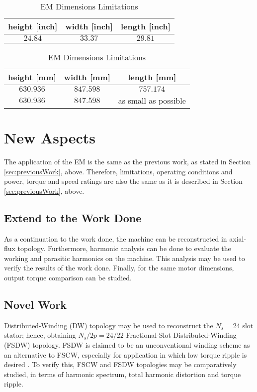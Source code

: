 \documentclass[11pt, a4paper]{article}
\begin{document}
	\begin{table}[h]
	\caption{Dimensions}
		\begin{subtable}[h]{1.00\textwidth}
			\begin{center}
				\begin{tabular}{c|c|c}
					height [inch] &  width [inch] &  length [inch]\\
					\hline
					$24.84$ & $33.37$ & $29.81$
				\end{tabular}
			\caption{Lycoming IO-360-L2A Dimensions}
			\end{center}
		\end{subtable}
		\begin{subtable}[h]{1.00\textwidth}
			\begin{center}
				\begin{tabular}{c|c|c}
					height [mm] &  width [mm] &  length [mm]\\
					\hline
					$630.936$ & $847.598$ & $757.174$ \\
					$630.936$ & $847.598$ & as small as possible
				\end{tabular}
			\caption{EM Dimensions Limitations}
			\end{center}
		\end{subtable}
		\label{tab:dimensions}
	\end{table}
	\newpage
	
	
	\section{New Aspects}
	The application of the EM is the same as the previous work, as stated in Section \ref{sec:previousWork}, above. Therefore, limitations, operating conditions and power, torque and speed ratings are also the same as it is described in Section \ref{sec:previousWork}, above.
	
	\subsection{Extend to the Work Done}
	As a continuation to the work done, the machine can be reconstructed in axial-flux topology. Furthermore, harmonic analysis can be done to evaluate the working and parasitic harmonics on the machine. This analysis may be used to verify the results of the work done. Finally, for the same motor dimensions, output torque comparison can be studied.
	
	\subsection{Novel Work}
	Distributed-Winding (DW) topology may be used to reconstruct the $N_s=24$ slot stator; hence, obtaining $N_s/2p=24/22$ Fractional-Slot Distributed-Winding (FSDW) topology. FSDW is claimed to be an unconventional winding scheme as an alternative to FSCW, especially for application in which low torque ripple is desired \cite{FSDW}. To verify this, FSCW and FSDW topologies may be comparatively studied, in terms of harmonic spectrum, total harmonic distortion and torque ripple.
	
\end{document}
